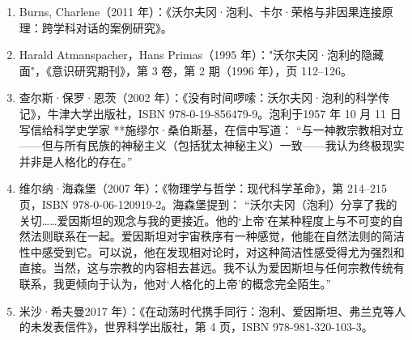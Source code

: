 \begin{enumerate}
\item Burns, Charlene（2011 年）：《沃尔夫冈·泡利、卡尔·荣格与非因果连接原理：跨学科对话的案例研究》。  
\item Harald Atmanspacher，Hans Primas（1995 年）："沃尔夫冈·泡利的隐藏面"，《意识研究期刊》，第 3 卷，第 2 期（1996 年），页 112–126。  
\item 查尔斯·保罗·恩茨（2002 年）：《没有时间啰嗦：沃尔夫冈·泡利的科学传记》，牛津大学出版社，ISBN 978-0-19-856479-9。泡利于1957 年 10 月 11 日写信给科学史学家 **施缪尔·桑伯斯基，在信中写道：  
  “与一神教宗教相对立——但与所有民族的神秘主义（包括犹太神秘主义）一致——我认为终极现实并非是人格化的存在。”  
\item 维尔纳·海森堡（2007 年）：《物理学与哲学：现代科学革命》，第 214–215 页，ISBN 978-0-06-120919-2。海森堡提到：  
  “沃尔夫冈（泡利）分享了我的关切……爱因斯坦的观念与我的更接近。他的‘上帝’在某种程度上与不可变的自然法则联系在一起。爱因斯坦对宇宙秩序有一种感觉，他能在自然法则的简洁性中感受到它。可以说，他在发现相对论时，对这种简洁性感受得尤为强烈和直接。当然，这与宗教的内容相去甚远。我不认为爱因斯坦与任何宗教传统有联系，我更倾向于认为，他对‘人格化的上帝’的概念完全陌生。” 
\item 米沙·希夫曼2017 年）：《在动荡时代携手同行：泡利、爱因斯坦、弗兰克等人的未发表信件》，世界科学出版社，第 4 页，ISBN 978-981-320-103-3。
\end{enumerate}
